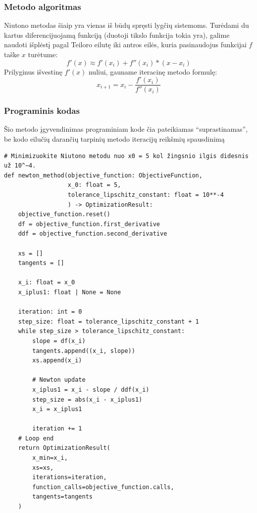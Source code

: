 \documentclass[lithuanian,a4paper,12pt]{article}
\begin{document}
\subsubsection*{Metodo algoritmas}
Niutono metodas šiaip yra vienas iš būdų spręsti lygčių sistemoms. Turėdami du kartus diferencijuojamą funkciją (duotoji tikslo funkcija tokia yra), galime naudoti išplėstį pagal Teiloro eilutę iki antros eilės, kuria pasinaudojus funkcijai $f$ taške $x$ turėtume:
\begin{equation*}
    f'(x) \approx f'(x_i) + f''(x_i) * (x - x_i) 
\end{equation*}
Prilyginus išvestinę $f'(x)$ nuliui, gauname iteracinę metodo formulę:
\begin{equation*}
    x_{i+1} = x_i - \frac{f'(x_i)}{f''(x_i)}
\end{equation*}

\pagebreak
\subsubsection*{Programinis kodas}
Šio metodo įgyvendinimas programiniam kode čia pateikiamas ``suprastinamas'', be kodo eilučių darančių tarpinių metodo iteracijų reikšmių spausdinimą

\begin{verbatim}
# Minimizuokite Niutono metodu nuo x0 = 5 kol žingsnio ilgis didesnis už 10^−4.
def newton_method(objective_function: ObjectiveFunction,
                  x_0: float = 5,
                  tolerance_lipschitz_constant: float = 10**-4
                  ) -> OptimizationResult:
    objective_function.reset()
    df = objective_function.first_derivative
    ddf = objective_function.second_derivative
    
    xs = []
    tangents = []
    
    x_i: float = x_0
    x_iplus1: float | None = None
    
    iteration: int = 0
    step_size: float = tolerance_lipschitz_constant + 1
    while step_size > tolerance_lipschitz_constant:
        slope = df(x_i)
        tangents.append((x_i, slope))
        xs.append(x_i)

        # Newton update
        x_iplus1 = x_i - slope / ddf(x_i)
        step_size = abs(x_i - x_iplus1)
        x_i = x_iplus1
        
        iteration += 1
    # Loop end
    return OptimizationResult(
        x_min=x_i, 
        xs=xs, 
        iterations=iteration, 
        function_calls=objective_function.calls,
        tangents=tangents
    )
\end{verbatim}
\pagebreak
\end{document}
